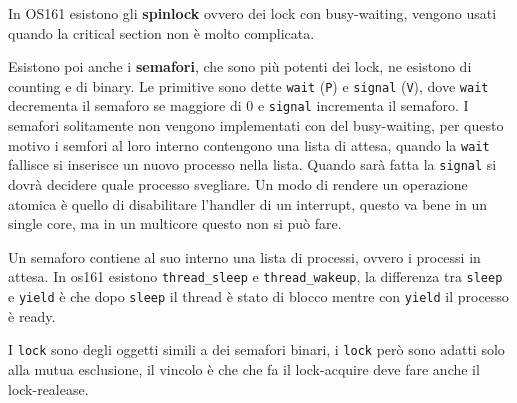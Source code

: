\documentclass[12pt]{article}
\begin{document}
In OS161 esistono gli \textbf{spinlock} ovvero dei lock con busy-waiting, vengono usati quando la critical section non \`e molto complicata.

Esistono poi anche i \textbf{semafori}, che sono pi\`u potenti dei lock, ne esistono di counting e di binary. Le primitive sono dette \texttt{wait} (\texttt{P}) e \texttt{signal} (\texttt{V}), dove \texttt{wait} decrementa il semaforo se maggiore di 0 e \texttt{signal} incrementa il semaforo. I semafori solitamente non vengono implementati con del busy-waiting, per questo motivo i semfori al loro interno contengono una lista di attesa, quando la \texttt{wait} fallisce si inserisce un nuovo processo nella lista. Quando sar\`a fatta la \texttt{signal} si dovr\`a decidere quale processo svegliare. Un modo di rendere un operazione atomica \`e quello di disabilitare l'handler di un interrupt, questo va bene in un single core, ma in un multicore questo non si pu\`o fare.


Un semaforo contiene al suo interno una lista di processi, ovvero i processi in attesa. In os161 esistono \texttt{thread\_sleep} e \texttt{thread\_wakeup}, la differenza tra \texttt{sleep} e \texttt{yield} \`e che dopo \texttt{sleep} il thread \`e stato di blocco mentre con \texttt{yield} il processo \`e ready.

I \texttt{lock} sono degli oggetti simili a dei semafori binari, i \texttt{lock} per\`o sono adatti solo alla mutua esclusione, il vincolo \`e che che fa il lock-acquire deve fare anche il lock-realease.
\end{document}
